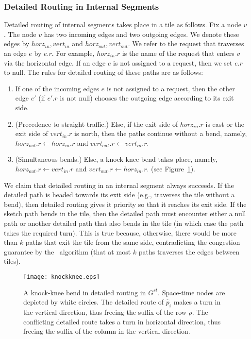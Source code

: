 \documentclass[11pt]{article}
\newcommand{\route}{\text{\sc{ipp}}}
\newcommand{\IPP}{\route}
\newenvironment{proof sketch}[1]{\noindent {\emph{Proof sketch of #1:}}}{\hfill \qed}
\begin{document}
\subsubsection{Detailed Routing in Internal Segments}\label{sec:detailed internal}
Detailed routing of internal segments takes place in a tile as follows. Fix a node
$v$. The node $v$ has two incoming edges and two outgoing edges. We denote these
edges by $horz_{in}, vert_{in}$ and $horz_{out},vert_{out}$.  We refer to the
request that traverses an edge $e$ by $e.r$.  For example, $horz_{in}.r$ is the name
of the request that enters $v$ via the horizontal edge. If an edge $e$ is not
assigned to a request, then we set $e.r$ to null. The rules for detailed routing of
these paths are as follows:
\begin{enumerate}
\item If one of the incoming edges $e$ is not assigned to a request, then the other
  edge $e'$ (if $e'.r$ is not null) chooses the outgoing edge according to its
  exit side.
\item (Precedence to straight traffic.) Else, if the exit side of $horz_{in}.r$ is east or the
  exit side of $vert_{in}.r$ is north, then the paths continue without a bend,
  namely, $horz_{out}.r\gets horz_{in}.r$ and $vert_{out}.r\gets vert_{in}.r$.
\item (Simultaneous bends.) Else, a knock-knee bend takes place, namely,
  $horz_{out}.r\gets vert_{in}.r$ and $vert_{out}.r\gets horz_{in}.r$. (see
  Figure~\ref{fig:knockknee}).
\end{enumerate}

We claim that detailed routing in an internal segment always succeeds.  If the
detailed path is headed towards its exit side (e.g., traverses the tile without a
bend), then detailed routing gives it priority so that it reaches its exit
side.  If the sketch path bends in the tile, then the detailed path must encounter
either a null path or another detailed path that also bends in the tile (in which
case the path takes the required turn). This is true because, otherwise, there would
be more than $k$ paths that exit the tile from the same side, contradicting the
congestion guarantee by the \IPP\ algorithm (that at most $k$ paths traverses the edges
between tiles).

\begin{figure}[H]
  \centering
    \texttt{[image: knockknee.eps]}
  \caption{A knock-knee bend in detailed routing in $G^{st}$. Space-time nodes are depicted by white circles. The detailed route of $\hat p_i$ makes a turn in the vertical direction, thus freeing the suffix of the row $\rho$. The conflicting detailed route takes a turn in horizontal direction, thus freeing the suffix of the column in the vertical direction.}
    \label{fig:knockknee}
\end{figure}
\end{document}
